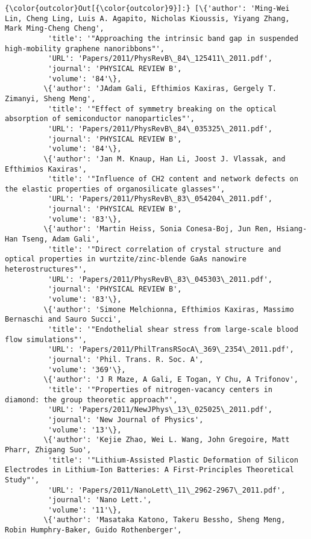 \documentclass[11pt]{article}
\begin{document}
\begin{Verbatim}[commandchars=\\\{\}]
{\color{outcolor}Out[{\color{outcolor}9}]:} [\{'author': 'Ming-Wei Lin, Cheng Ling, Luis A. Agapito, Nicholas Kioussis, Yiyang Zhang, Mark Ming-Cheng Cheng',
          'title': '"Approaching the intrinsic band gap in suspended high-mobility graphene nanoribbons"',
          'URL': 'Papers/2011/PhysRevB\_84\_125411\_2011.pdf',
          'journal': 'PHYSICAL REVIEW B',
          'volume': '84'\},
         \{'author': 'JAdam Gali, Efthimios Kaxiras, Gergely T. Zimanyi, Sheng Meng',
          'title': '"Effect of symmetry breaking on the optical absorption of semiconductor nanoparticles"',
          'URL': 'Papers/2011/PhysRevB\_84\_035325\_2011.pdf',
          'journal': 'PHYSICAL REVIEW B',
          'volume': '84'\},
         \{'author': 'Jan M. Knaup, Han Li, Joost J. Vlassak, and Efthimios Kaxiras',
          'title': '"Influence of CH2 content and network defects on the elastic properties of organosilicate glasses"',
          'URL': 'Papers/2011/PhysRevB\_83\_054204\_2011.pdf',
          'journal': 'PHYSICAL REVIEW B',
          'volume': '83'\},
         \{'author': 'Martin Heiss, Sonia Conesa-Boj, Jun Ren, Hsiang-Han Tseng, Adam Gali',
          'title': '"Direct correlation of crystal structure and optical properties in wurtzite/zinc-blende GaAs nanowire heterostructures"',
          'URL': 'Papers/2011/PhysRevB\_83\_045303\_2011.pdf',
          'journal': 'PHYSICAL REVIEW B',
          'volume': '83'\},
         \{'author': 'Simone Melchionna, Efthimios Kaxiras, Massimo Bernaschi and Sauro Succi',
          'title': '"Endothelial shear stress from large-scale blood flow simulations"',
          'URL': 'Papers/2011/PhilTransRSocA\_369\_2354\_2011.pdf',
          'journal': 'Phil. Trans. R. Soc. A',
          'volume': '369'\},
         \{'author': 'J R Maze, A Gali, E Togan, Y Chu, A Trifonov',
          'title': '"Properties of nitrogen-vacancy centers in diamond: the group theoretic approach"',
          'URL': 'Papers/2011/NewJPhys\_13\_025025\_2011.pdf',
          'journal': 'New Journal of Physics',
          'volume': '13'\},
         \{'author': 'Kejie Zhao, Wei L. Wang, John Gregoire, Matt Pharr, Zhigang Suo',
          'title': '"Lithium-Assisted Plastic Deformation of Silicon Electrodes in Lithium-Ion Batteries: A First-Principles Theoretical Study"',
          'URL': 'Papers/2011/NanoLett\_11\_2962-2967\_2011.pdf',
          'journal': 'Nano Lett.',
          'volume': '11'\},
         \{'author': 'Masataka Katono, Takeru Bessho, Sheng Meng, Robin Humphry-Baker, Guido Rothenberger',

\end{Verbatim}
\end{document}
